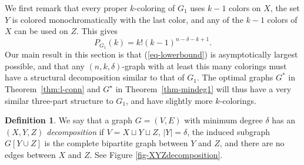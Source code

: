 \documentclass[11pt]{article}
\theoremstyle{plain}
\theoremstyle{definition}
\newtheorem{definition}[theorem]{Definition}
\theoremstyle{remark}
\begin{document}
We first remark that every proper $k$-coloring of $G_1$ uses $k-1$ colors on $X$, the set $Y$ is colored monochromatically with the last color, and any of the $k-1$ colors of $X$ can be used on $Z$.  This gives
\begin{equation}\label{eq-lowerbound}
P_{G_1}(k) = k! (k-1)^{n-\delta-k+1}.
\end{equation}
Our main result in this section is that (\ref{eq-lowerbound}) is asymptotically largest possible, and that any $(n,k,\delta)$-graph with at least this many colorings must have a structural decomposition similar to that of $G_1$. The optimal graphs $G^*$ in Theorem~\ref{thm:l-conn} and $G^\star$ in  Theorem~\ref{thm-mindeg1} will thus have a very similar three-part structure to $G_1$, and have slightly more $k$-colorings.

\begin{definition}
We say that a graph $G=(V,E)$ with minimum degree $\delta$ has an {\em $(X,Y,Z)$ decomposition} if $V=X\sqcup Y \sqcup Z$, $|Y| = \delta$, the induced subgraph $G[Y\cup Z]$ is the complete bipartite graph between $Y$ and $Z$, and there are no edges between $X$ and $Z$. See Figure \ref{fig-XYZdecomposition}.
\end{definition}
\end{document}
